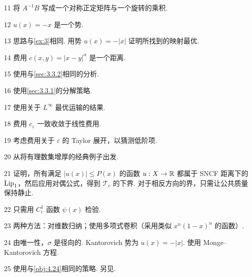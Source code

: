 \begin{sourcehint}{11}
将 $A^{-1}B$ 写成一个对称正定矩阵与一个旋转的乘积.
\end{sourcehint}
\begin{sourcehint}{12}
$u(x)=-x$ 是一个势.
\end{sourcehint}
\begin{sourcehint}{13}
思路与\autoref{ex:3}相同. 用势 $u(x)=-|x|$ 证明所找到的映射最优.
\end{sourcehint}
\begin{sourcehint}{14}
费用 $c(x,y)=|x-y|^\alpha$ 是一个距离.
\end{sourcehint}
\begin{sourcehint}{15}
使用与\autoref{sec:3.3.2}相同的分析.
\end{sourcehint}
\begin{sourcehint}{16}
使用\autoref{sec:3.3.1}的分解策略.
\end{sourcehint}
\begin{sourcehint}{17}
使用关于 $L^\infty$ 最优运输的结果.
\end{sourcehint}
\begin{sourcehint}{18}
费用 $c_\varepsilon$ 一致收敛于线性费用.
\end{sourcehint}
\begin{sourcehint}{19}
考虑费用关于 $\varepsilon$ 的 Taylor 展开，以猜测低阶项.
\end{sourcehint}
\begin{sourcehint}{20}
从将有理数集增厚的经典例子出发.
\end{sourcehint}
\begin{sourcehint}{21}
证明，所有满足 $|u(x)|\leq P(x)$ 的函数 $u:X\to\mathbb R$ 都属于 SNCF 距离下的 $\operatorname{Lip}_1$，然后应用对偶公式，得到 $\mathscr T_c$ 的下界. 对于相反方向的界，只需让公共质量保持静止.
\end{sourcehint}
\begin{sourcehint}{22}
只需用 $C_c^1$ 函数 $\psi(x)$ 检验.
\end{sourcehint}
\begin{sourcehint}{23}
两种方法：对维数归纳；使用多项式卷积（采用类似 $x^n(1-x)^n$ 的函数）.
\end{sourcehint}
\begin{sourcehint}{24}
由唯一性，$\sigma$ 是径向的. Kantorovich 势为 $u(x)=-|x|$. 使用 Monge--Kantorovich 方程.
\end{sourcehint}
\begin{sourcehint}{25}
使用与\autoref{obj:4.24}相同的策略. 另见\cite{b273}.
\end{sourcehint}
